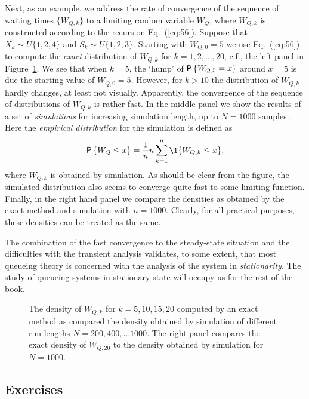 Next, as an example, we address the rate of convergence of the
sequence of waiting times $\{W_{Q,k}\}$ to a limiting random variable
$W_Q$, where $W_{Q,k}$ is constructed according to the recursion
Eq.~(\ref{eq:56}). Suppose that $X_k\sim U\{1,2,4\}$ and
$S_k\sim U\{1,2,3\}$.  Starting with $W_{Q,0}=5$ we use
Eq.~(\ref{eq:56}) to compute the \emph{exact} distribution of
$W_{Q,k}$ for $k=1,2,\ldots, 20$, c.f., the left panel in
Figure~\ref{fig:convergence}. We see that when $k=5$, the `hump' of
$\P{W_{Q,5}=x}$ around $x=5$ is due the starting value of
$W_{Q,0}=5$. However, for $k>10$ the distribution of $W_{Q,k}$ hardly
changes, at least not visually. Apparently, the convergence of the
sequence of distributions of $W_{Q,k}$ is rather fast. In the middle
panel we show the results of a set of \emph{simulations} for
increasing simulation length, up to $N=1000$ samples. Here the
\emph{empirical distribution} for the simulation is defined as
\begin{equation*}
\P{W_Q\leq x} =   \frac 1n n\sum_{k=1}^n \1{W_{Q,k} \leq x},
\end{equation*}
where $W_{Q,k}$ is obtained by simulation. As should be clear from the
figure, the simulated distribution also seems to converge quite fast to
some limiting function. Finally, in the right hand panel we compare
the densities as obtained by the exact method and simulation with
$n=1000$. Clearly, for all practical purposes, these densities can be
treated as the same.

The combination of the fast convergence to the steady-state situation
and the difficulties with the transient analysis validates, to some
extent, that most queueing theory is concerned with the analysis of
the system in \emph{stationarity}. The study of queueing systems in
stationary state will occupy us for the rest of the book.

\begin{figure}
  \centering



  \caption{The density of $W_{Q,k}$ for $k=5, 10, 15, 20$ computed by
    an exact method as compared the density obtained by simulation of
    different run lengths $N=200, 400, \ldots 1000$. The right panel
    compares the exact density of $W_{Q,20}$ to the density obtained by simulation
    for $N=1000$.}
\label{fig:convergence}
\end{figure}

\subsection*{Exercises}
\label{sec:exercises}


